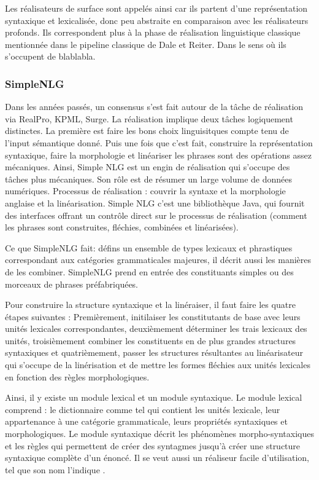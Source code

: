Les réalisateurs de surface sont appelés ainsi car ils partent d'une représentation syntaxique et lexicalisée, donc peu abstraite en comparaison avec les réalisateurs profonds. Ils correspondent plus à la phase de réalisation linguistique classique mentionnée dans le pipeline classique de Dale et Reiter. Dans le sens où ils s'occupent de blablabla.

\subsubsection{SimpleNLG}
 \citep{GattSimpleNLGRealisationEngine2009}
Dans les années passés, un consensus s'est fait autour de la tâche de réalisation via RealPro, KPML, Surge. La réalisation implique deux tâches logiquement distinctes. La première est faire les bons choix linguisitques compte tenu de l'input sémantique donné. Puis une fois que c'est fait, construire la représentation syntaxique, faire la morphologie et linéariser les phrases sont des opérations assez mécaniques. Ainsi, Simple NLG est un engin de réalisation qui s'occupe des tâches plus mécaniques. Son rôle est de résumer un large volume de données numériques. Processus de réalisation : couvrir la syntaxe et la morphologie anglaise et la linéarisation. Simple NLG c'est une bibliothèque Java, qui fournit des interfaces offrant un contrôle direct sur le processus de réalisation (comment les phrases sont construites, fléchies, combinées et linéarisées).

Ce que SimpleNLG fait: défins un ensemble de types lexicaux et phrastiques correspondant aux catégories grammaticales majeures, il décrit aussi les manières de les combiner. SimpleNLG prend en entrée des constituants simples ou des morceaux de phrases préfabriquées.

Pour construire la structure syntaxique et la linéraiser, il faut faire les quatre étapes suivantes :
Premièrement, initilaiser les constitutants de base avec leurs unités lexicales correspondantes, deuxièmement déterminer les trais lexicaux des unités, troisièmement combiner les constituents en de plus grandes structures syntaxiques et quatrièmement, passer les structures résultantes au linéarisateur qui s'occupe de la linérisation et de mettre les formes fléchies aux unités lexicales en fonction des règles morphologiques.

Ainsi, il y existe un module lexical et un module syntaxique. Le module lexical comprend : le dictionnaire comme tel qui contient les unités lexicale, leur appartenance à une catégorie grammaticale, leurs propriétés syntaxiques et morphologiques. Le module syntaxique décrit les phénomènes morpho-syntaxiques et les règles qui permettent de créer des syntagmes jusqu'à créer une structure syntaxique complète d'un énoncé. Il se veut aussi un réaliseur facile d'utilisation, tel que son nom l'indique \citep{DaoustJSREALTextRealizer2015}.

